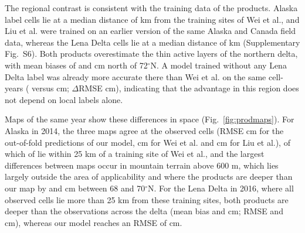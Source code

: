 
The regional contrast is consistent with the training data of the products. Alaska label cells lie at a median distance of \ndistweiAkmed{} km from the training sites of Wei et al., and Liu et al. were trained on an earlier version of the same Alaska and Canada field data, whereas the Lena Delta cells lie at a median distance of \ndistweiLemed{} km (Supplementary Fig.~S6). Both products overestimate the thin active layers of the northern delta, with mean biases of \nbiasLeNorthWei{} and \nbiasLeNorthLiu{} cm north of 72$^\circ$N. A model trained without any Lena Delta label was already more accurate there than Wei et al. on the same cell-years (\ntlvprmseLeRsWeizero{} versus \ntlvprmseLeWeizero{} cm; $\Delta$RMSE \ntlvpLeRsWeizero{} cm), indicating that the advantage in this region does not depend on local labels alone.

Maps of the same year show these differences in space (Fig.~\ref{fig:prodmaps}). For Alaska in 2014, the three maps agree at the observed cells (RMSE \nfeAkOof{} cm for the out-of-fold predictions of our model, \nfeAkWei{} cm for Wei et al. and \nfeAkLiu{} cm for Liu et al.), of which \nfeAkNearWei{} of \nfeAkN{} lie within 25 km of a training site of Wei et al., and the largest differences between maps occur in mountain terrain above 600 m, which lies largely outside the area of applicability and where the products are deeper than our map by \nmapAkFootMtnWei{} and \nmapAkFootMtnLiu{} cm between 68 and 70$^\circ$N. For the Lena Delta in 2016, where all \nfeLeN{} observed cells lie more than 25 km from these training sites, both products are deeper than the observations across the delta (mean bias \nfeLeBiasWei{} and \nfeLeBiasLiu{} cm; RMSE \nfeLeWei{} and \nfeLeLiu{} cm), whereas our model reaches an RMSE of \nfeLeOof{} cm.

